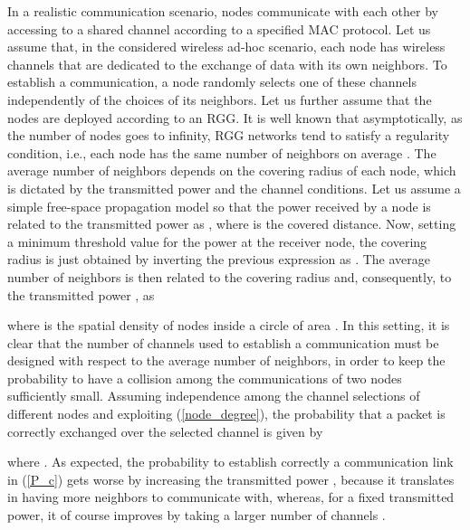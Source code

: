 \documentclass[10pt,twocolumn]{IEEEtran}
\begin{document}
In a realistic communication scenario, nodes communicate with each other by accessing to a shared channel according to a specified MAC protocol. Let us assume that, in the considered wireless ad-hoc scenario, each node has  wireless channels that are dedicated to the exchange of data with its own neighbors. To establish a communication, a node randomly selects one of these channels independently of the choices of its neighbors. Let us further assume that the nodes are deployed according to an RGG. It is well known that asymptotically, as the number of nodes goes to infinity, RGG networks tend to satisfy a regularity condition, i.e., each node has the same number  of neighbors on average \cite{Penrose}. The average number  of neighbors depends on the covering radius of each node, which is dictated by the transmitted power and the channel conditions. Let us assume a simple free-space propagation model so that the power received by a node is related to the transmitted power as , where  is the covered distance. Now, setting a minimum threshold value  for the power at the receiver node, the covering radius is just obtained by inverting the previous expression as . The average number  of neighbors is then related to the covering radius and, consequently, to the transmitted power , as

where  is the spatial density of nodes inside a circle of area . In this setting, it is clear that the number  of channels used to establish a communication must be designed with respect to the average number  of neighbors, in order to keep the probability to have a collision among the communications of two nodes sufficiently small. Assuming independence among the channel selections of different nodes and exploiting (\ref{node_degree}), the probability that a packet is correctly exchanged over the selected channel is given by

where .  As expected, the probability to establish correctly a communication link in (\ref{P_c}) gets worse by increasing the transmitted power , because it translates in having more neighbors to communicate with, whereas, for a fixed transmitted power, it of course improves by taking a larger number of channels .
\end{document}
